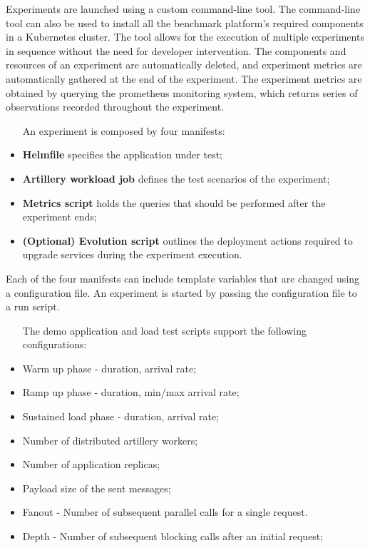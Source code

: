 Experiments are launched using a custom command-line tool.
The command-line tool can also be used to install all the benchmark platform's required components in a Kubernetes cluster.
The tool allows for the execution of multiple experiments in sequence without the need for developer intervention.
The components and resources of an experiment are automatically deleted, and experiment metrics are automatically gathered at the end of the experiment.
The experiment metrics are obtained by querying the prometheus monitoring system, which returns series of observations recorded throughout the experiment.
\begin{itemize}
    \setlength\itemsep{0em}
    \item [An experiment is composed by four manifests:]
    \item \textbf{Helmfile} specifies the application under test;
    \item \textbf{Artillery workload job} defines the test scenarios of the experiment;
    \item \textbf{Metrics script} holds the queries that should be performed after the experiment ends;
    \item \textbf{(Optional) Evolution script} outlines the deployment actions required to upgrade services during the experiment execution.
\end{itemize}

Each of the four manifests can include template variables that are changed using a configuration file.
An experiment is started by passing the configuration file to a run script.
\begin{itemize}
    \setlength\itemsep{0em}
    \item [The demo application and load test scripts support the following configurations:]
    \item Warm up phase - duration, arrival rate;
    \item Ramp up phase - duration, min/max arrival rate;
    \item Sustained load phase - duration, arrival rate;
    \item Number of distributed artillery workers;
    \item Number of application replicas;
    \item Payload size of the sent messages;
    \item Fanout - Number of subsequent parallel calls for a single request.
    \item Depth - Number of subsequent blocking calls after an initial request;
\end{itemize}

